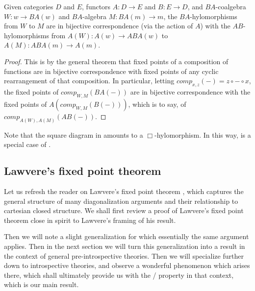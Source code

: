 \begin{theorem}\label{HylomorphismTransfer}
Given categories $D$ and $E$, functors $A : D \to E$ and $B : E \to D$, and $BA$-coalgebra $W : w \to BA(w)$ and $BA$-algebra $M : BA(m) \to m$, the $BA$-hylomorphisms from $W$ to $M$ are in bijective correspondence (via the action of $A$) with the $AB$-hylomorphisms from $A(W) : A(w) \to ABA(w)$ to $A(M) : ABA(m) \to A(m)$.
\end{theorem}
\begin{proof}
This is by the general theorem that fixed points of a composition of functions are in bijective correspondence with fixed points of any cyclic rearrangement of that composition. In particular, letting $comp_{x, z}(-) = z \circ - \circ x$, the fixed points of $comp_{W, M}(BA(-))$ are in bijective correspondence with the fixed points of $A(comp_{W, M}(B(-)))$, which is to say, of $comp_{A(W), A(M)}(AB(-))$.
\end{proof}

Note that the square diagram in  amounts to a $\Box$-hylomorphism. In this way,  is a special case of .



\subsection{Lawvere's fixed point theorem}\label{LawvereFPTSection}
Let us refresh the reader on Lawvere's fixed point theorem \autocite{lawvere1969diagonal}, which captures the general structure of many diagonalization arguments and their relationship to cartesian closed structure. We shall first review a proof of Lawvere's fixed point theorem close in spirit to Lawvere's framing of his result.

Then we will note a slight generalization for which essentially the same argument applies. Then in the next section we will turn this generalization into a result in the context of general pre-introspective theories. Then we will specialize further down to introspective theories, and observe a wonderful  phenomenon which arises there, which shall ultimately provide us with the \Loeb/ property in that context, which is our main result.

